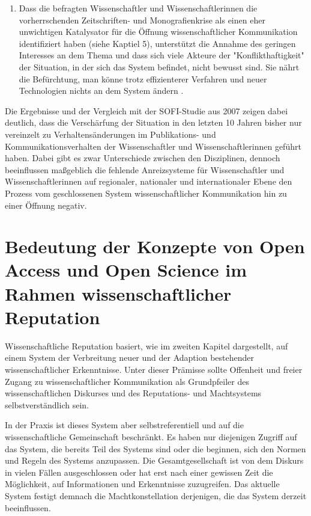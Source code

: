\begin{enumerate}
\item Dass die befragten Wissenschaftler und Wissenschaftlerinnen die vorherrschenden Zeitschriften- und Monografienkrise als einen eher unwichtigen Katalysator für die Öffnung wissenschaftlicher Kommunikation identifiziert haben (siehe Kaptiel 5), unterstützt die Annahme des geringen Interesses an dem Thema und dass sich viele Akteure der "Konflikthaftigkeit" \cite{Kaldewey_2010} der Situation, in der sich das System befindet, nicht bewusst sind. Sie nährt die Befürchtung, man könne trotz effizienterer Verfahren und neuer Technologien nichts an dem System ändern \cite{Parks_2002}.
\end{enumerate}

Die Ergebnisse und der Vergleich mit der SOFI-Studie aus 2007 zeigen dabei deutlich, dass die Verschärfung der Situation in den letzten 10 Jahren bisher nur vereinzelt zu Verhaltensänderungen im Publikations- und Kommunikationsverhalten der Wissenschaftler und Wissenschaftlerinnen geführt haben. Dabei gibt es zwar Unterschiede zwischen den Disziplinen, dennoch beeinflussen maßgeblich die fehlende Anreizsysteme für Wissenschaftler und Wissenschaftlerinnen auf regionaler, nationaler und internationaler Ebene den Prozess vom geschlossenen System wissenschaftlicher Kommunikation hin zu einer Öffnung negativ.

\section{Bedeutung der Konzepte von Open Access und Open Science im Rahmen wissenschaftlicher Reputation}

Wissenschaftliche Reputation basiert, wie im zweiten Kapitel dargestellt, auf einem System der Verbreitung neuer und der Adaption bestehender wissenschaftlicher Erkenntnisse. Unter dieser Prämisse sollte Offenheit und freier Zugang zu wissenschaftlicher Kommunikation als Grundpfeiler des wissenschaftlichen Diskurses und des Reputations- und Machtsystems selbstverständlich sein.

In der Praxis ist dieses System aber selbstreferentiell und auf die wissenschaftliche Gemeinschaft beschränkt. Es haben nur diejenigen Zugriff auf das System, die bereits Teil des Systems sind oder die beginnen, sich den Normen und Regeln des Systems anzupassen. Die Gesamtgesellschaft ist von dem Diskurs in vielen Fällen ausgeschlossen oder hat erst nach einer gewissen Zeit die Möglichkeit, auf Informationen und Erkenntnisse zuzugreifen. Das aktuelle System festigt demnach die Machtkonstellation derjenigen, die das System derzeit beeinflussen.

